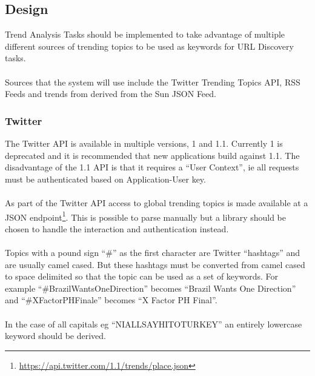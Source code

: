 \subsection{Design}
Trend Analysis Tasks should be implemented to take advantage of multiple different sources of trending topics to be used as keywords for URL Discovery tasks.

\paragraph{}
Sources that the system will use include the Twitter Trending Topics API, RSS Feeds and trends from derived from the Sun JSON Feed.

\subsubsection{Twitter}
The Twitter API is available in multiple versions, 1 and 1.1. Currently 1 is deprecated and it is recommended that new applications build against 1.1.  The disadvantage of the 1.1 API is that it requires a ``User Context'', ie all requests must be authenticated based on Application-User key.

\paragraph{}
As part of the Twitter API access to global trending topics is made available at a JSON endpoint\footnote{\url{https://api.twitter.com/1.1/trends/place.json}}. This is possible to parse manually but a library should be chosen to handle the interaction and authentication instead.

\paragraph{}
Topics with a pound sign ``\#'' as the first character are Twitter ``hashtags'' and are usually camel cased. But these hashtags must be converted from camel cased to space delimited so that the topic can be used as a set of keywords. For example ``\#BrazilWantsOneDirection'' becomes ``Brazil Wants One Direction'' and ``\#XFactorPHFinale'' becomes ``X Factor PH Final''.

\paragraph{}
In the case of all capitals eg ``NIALLSAYHITOTURKEY'' an entirely lowercase keyword should be derived.

